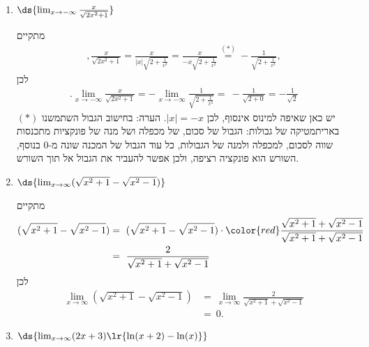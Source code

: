 \begin{enumerate}
\item $\ds{ \lim_{x \to -\infty} \frac{x}{\sqrt{2x^2 + 1}}}$
\ifsol
{}
\begin{solbox}
מתקיים
\begin{align*}
    ,\frac{x}{\sqrt{2x^2 + 1}}=
    \frac{x}{|x|\sqrt{2 + \frac{1}{x^2}}}
    =
    \frac{x}{-x\sqrt{2 + \frac{1}{x^2}}}
    \overset{(\ast)}{=}
    -\frac{1}{\sqrt{2 + \frac{1}{x^2}}},
\end{align*}
לכן
\begin{align*}
    .\lim_{x \to -\infty} \frac{x}{\sqrt{2x^2 + 1}}
    =
    -\lim_{x \to -\infty} \frac{1}{\sqrt{2 + \frac{1}{x^2}}}
    =\ -\frac{1}{\sqrt{2 + 0}}
    = -\frac{1}{\sqrt{2}}
\end{align*}
$(\ast)$
    יש כאן שאיפה למינוס אינסוף, לכן
    $|x|=-x$.
הערה: בחישוב הגבול השתמשנו באריתמטיקה של גבולות: הגבול של סכום, של מכפלה ושל מנה של פונקציות מתכנסות שווה לסכום, למכפלה ולמנה של הגבולות, כל עוד הגבול של המכנה שונה מ-$0$ בנוסף, השורש הוא פונקציה רציפה, ולכן אפשר להעביר את הגבול אל תוך השורש.
\end{solbox}
\fi

\item $\ds{ \lim_{x \to \infty}(\sqrt{x^2+1}-\sqrt{x^2-1})}$
\ifsol
{}
\begin{solbox}
מתקיים
\begin{align*}
    (\sqrt{x^2+1}-\sqrt{x^2-1})&=\ (\sqrt{x^2+1}-\sqrt{x^2-1})\cdot{\color{red}\frac{\sqrt{x^2+1}+\sqrt{x^2-1}}{\sqrt{x^2+1}+\sqrt{x^2-1}}}\\
    &=\ \frac{2}{\sqrt{x^2+1}+\sqrt{x^2-1}}
\end{align*}
לכן
\begin{align*}
    \lim_{x \to \infty}(\sqrt{x^2+1}-\sqrt{x^2-1})
    &=\ \lim_{x \to \infty}\frac{2}{\sqrt{x^2+1}+\sqrt{x^2-1}}\\
    &=\ 0.
\end{align*}
\end{solbox}
\fi

\item $\ds{ \lim_{x \to \infty} (2x+3)\lr{\ln(x + 2) - \ln(x)}}$


\end{enumerate}
